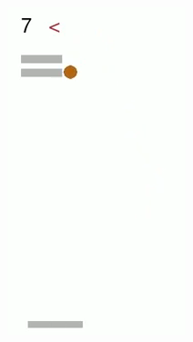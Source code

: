 \begin{figure}[h]
	~ %
	\begin{subfigure}[b]{0.23\textwidth}
		\includegraphics[width=\textwidth]{images/breakout-33-bt-2.png}
	\end{subfigure}
	\begin{subfigure}[b]{0.23\textwidth}

\end{subfigure}
\end{figure}
